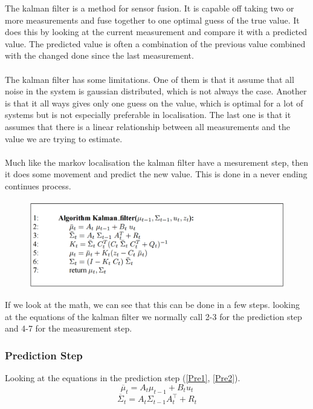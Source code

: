 The kalman filter is a method for sensor fusion. It is capable off taking two or more measurements and fuse together to one optimal guess of the true value. It does this by looking at the current measurement and compare it with a predicted value. The predicted value is often a combination of the previous value combined with the changed done since the last measurement. 
\\\\
The kalman filter has some limitations. One of them is that it assume that all noise in the system is gaussian distributed, which is not always the case. Another is that it all ways gives only one guess on the value, which is optimal for a lot of systems but is not especially preferable in localisation. The last one is that it assumes that there is a linear relationship between all measurements and the value we are trying to estimate. 
\\\\
Much like the markov localisation the kalman filter have a mesurement step, then it does some movement and predict the new value. This is done in a never ending continues process. 

\begin{figure}[H]
\includegraphics[scale=0.51]{billeder/KalmanFilter.png}
\end{figure}

If we look at the math, we can see that this can be done in a few steps. looking at the equations of the kalman filter we normally call 2-3 for the prediction step and 4-7 for the measurement step. 

\subsubsection{Prediction Step}
Looking at the equations in the prediction step (\ref{Pre1}, \ref{Pre2}).
\begin{equation}
\overline{\mu}_t = A_t \mu_{t-1} + B_t u_t
\label{Pre1}
\end{equation}
\begin{equation}
\overline{\Sigma}_t = A_t \Sigma_{t-1} A^{\intercal}_t+ R_t
\label{Pre2}
\end{equation}

